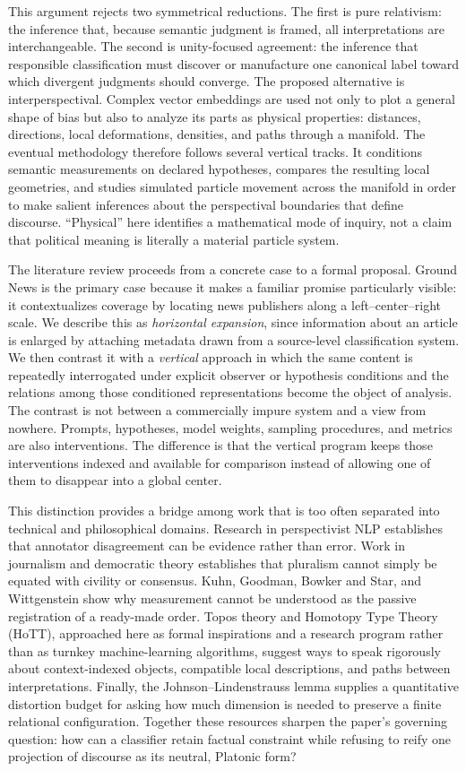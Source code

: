 This argument rejects two symmetrical reductions. The first is pure relativism: the inference that, because semantic judgment is framed, all interpretations are interchangeable. The second is unity-focused agreement: the inference that responsible classification must discover or manufacture one canonical label toward which divergent judgments should converge. The proposed alternative is interperspectival. Complex vector embeddings are used not only to plot a general shape of bias but also to analyze its parts as physical properties: distances, directions, local deformations, densities, and paths through a manifold. The eventual methodology therefore follows several vertical tracks. It conditions semantic measurements on declared hypotheses, compares the resulting local geometries, and studies simulated particle movement across the manifold in order to make salient inferences about the perspectival boundaries that define discourse. ``Physical'' here identifies a mathematical mode of inquiry, not a claim that political meaning is literally a material particle system.

The literature review proceeds from a concrete case to a formal proposal. Ground News is the primary case because it makes a familiar promise particularly visible: it contextualizes coverage by locating news publishers along a left--center--right scale. We describe this as \emph{horizontal expansion}, since information about an article is enlarged by attaching metadata drawn from a source-level classification system. We then contrast it with a \emph{vertical} approach in which the same content is repeatedly interrogated under explicit observer or hypothesis conditions and the relations among those conditioned representations become the object of analysis. The contrast is not between a commercially impure system and a view from nowhere. Prompts, hypotheses, model weights, sampling procedures, and metrics are also interventions. The difference is that the vertical program keeps those interventions indexed and available for comparison instead of allowing one of them to disappear into a global center.

This distinction provides a bridge among work that is too often separated into technical and philosophical domains. Research in perspectivist NLP establishes that annotator disagreement can be evidence rather than error. Work in journalism and democratic theory establishes that pluralism cannot simply be equated with civility or consensus. Kuhn, Goodman, Bowker and Star, and Wittgenstein show why measurement cannot be understood as the passive registration of a ready-made order. Topos theory and Homotopy Type Theory (HoTT), approached here as formal inspirations and a research program rather than as turnkey machine-learning algorithms, suggest ways to speak rigorously about context-indexed objects, compatible local descriptions, and paths between interpretations. Finally, the Johnson--Lindenstrauss lemma supplies a quantitative distortion budget for asking how much dimension is needed to preserve a finite relational configuration. Together these resources sharpen the paper's governing question: how can a classifier retain factual constraint while refusing to reify one projection of discourse as its neutral, Platonic form?

